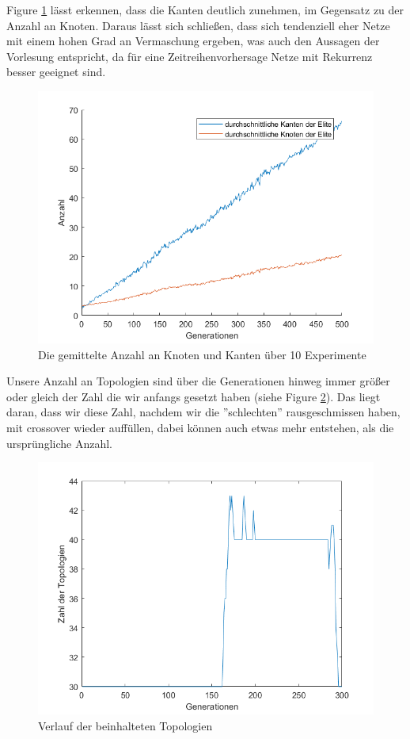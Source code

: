 \documentclass{hbrs-ecta-report}
\begin{document}
Figure \ref{fig:KantenUndKnoten} lässt erkennen, dass die Kanten deutlich zunehmen, im Gegensatz zu der Anzahl an Knoten. Daraus lässt sich schließen, dass sich tendenziell eher Netze mit einem hohen Grad an Vermaschung ergeben, was auch den Aussagen der Vorlesung entspricht, da für eine Zeitreihenvorhersage Netze mit Rekurrenz besser geeignet sind.\\
\begin{figure}[h!]
	\includegraphics[width=\linewidth]{img/KantenUndKnoten}
	\caption{Die gemittelte Anzahl an Knoten und Kanten über 10 Experimente}
	\label{fig:KantenUndKnoten}
\end{figure}

Unsere Anzahl an Topologien sind über die Generationen hinweg immer größer oder gleich der Zahl die wir anfangs gesetzt haben (siehe Figure \ref{fig:VerlaufTopo}). Das liegt daran, dass wir diese Zahl, nachdem wir die ''schlechten'' rausgeschmissen haben, mit crossover wieder auffüllen, dabei können auch etwas mehr entstehen, als die ursprüngliche Anzahl.\\
\begin{figure}[h!]
	\includegraphics[width=\linewidth]{img/VerlaufTopo}
	\caption{Verlauf der beinhalteten Topologien}
	\label{fig:VerlaufTopo}
\end{figure}
\end{document}
